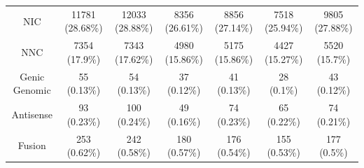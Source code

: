 \begin{landscape}
\begin{table}[]
{\begin{tabular}{@{}ccccccc@{}}
		NIC                                 & 11781 (28.68\%)                                                          & 12033 (28.88\%)                                                          & 8356 (26.61\%)                                                           & 8856 (27.14\%)                                                          & 7518 (25.94\%)                                                           & 9805 (27.88\%)                                                           \\
		NNC                                 & 7354 (17.9\%)                                                            & 7343 (17.62\%)                                                           & 4980 (15.86\%)                                                           & 5175 (15.86\%)                                                          & 4427 (15.27\%)                                                           & 5520 (15.7\%)                                                            \\
		Genic Genomic                       & 55 (0.13\%)                                                              & 54 (0.13\%)                                                              & 37 (0.12\%)                                                              & 41 (0.13\%)                                                             & 28 (0.1\%)                                                               & 43 (0.12\%)                                                              \\
		Antisense                           & 93 (0.23\%)                                                              & 100 (0.24\%)                                                             & 49 (0.16\%)                                                              & 74 (0.23\%)                                                             & 65 (0.22\%)                                                              & 74 (0.21\%)                                                              \\
		Fusion                              & 253 (0.62\%)                                                             & 242 (0.58\%)                                                             & 180 (0.57\%)                                                             & 176 (0.54\%)                                                            & 155 (0.53\%)                                                             & 177 (0.5\%)                                                              \\

\end{tabular}}
\end{table}
\end{landscape}
